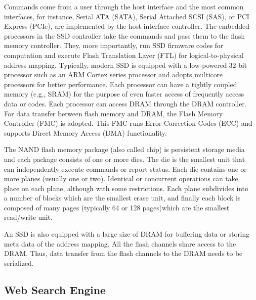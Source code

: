 Commands come from a user through the host interface and the most common interfaces, for instance, Serial ATA (SATA), Serial Attached SCSI (SAS), or PCI Express (PCIe), are implemented by the host interface controller.
The embedded processors in the SSD controller take the commands and pass them to the flash memory controller. They, more importantly, run SSD firmware codes for computation and execute Flash Translation Layer (FTL) for logical-to-physical address mapping. Typically, modern SSD is equipped with a low-powered 32-bit processor such as an ARM Cortex series processor and adopts multicore processors for better performance. Each processor can have a tightly coupled memory (e.g., SRAM) for the purpose of even faster access of frequently access data or codes. Each processor can access DRAM through the DRAM controller. For data transfer between flash memory and DRAM, the Flash Memory Controller (FMC) is adopted. This FMC runs Error Correction Codes (ECC) and supports Direct Memory Access (DMA) functionality.

The NAND flash memory package (also called chip) is persistent storage media and each package consists of one or more dies. The die is the smallest unit that can independently execute commands or report status. Each die contains one or more planes (usually one or two). Identical or concurrent operations can take place on each plane, although with some restrictions. Each plane subdivides into a number of blocks which are the smallest erase unit, and finally each block is composed of many pages (typically 64 or 128 pages)which are the smallest read/write unit.

An SSD is also equipped with a large size of DRAM for buffering data or storing meta data of the address mapping. All the flash channels share access to the DRAM. Thus, data transfer from the flash channels to the DRAM needs to be serialized.


\subsection{Web Search Engine}\label{sec:searchEngineArch}

